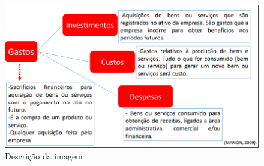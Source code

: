 \documentclass{article}
\begin{document}
\begin{figure}[H]  %
    \centering
    \begin{minipage}{1.0\textwidth}
        \centering
        \includegraphics[width=\textwidth]{img/imagem9.png}
        \caption{Descrição da imagem}  %
        \label{fig:exemplo}
    \end{minipage}
\end{figure}
\end{document}
